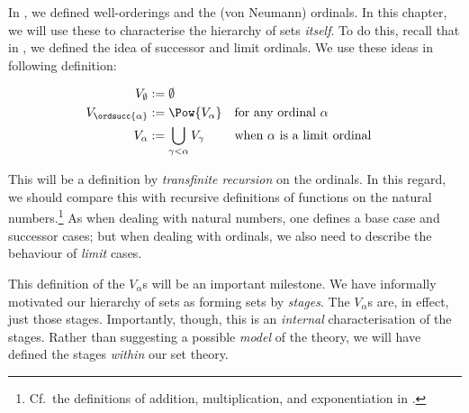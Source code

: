 \documentclass[../../../include/open-logic-section]{subfiles}
\begin{document}


In , we defined well-orderings and the
(von Neumann) ordinals. In this chapter, we will use these to
characterise the hierarchy of sets \emph{itself}. To do this, recall
that in , we defined the idea of
successor and limit ordinals. We use these ideas in following
definition:

\begin{defn}
	\begin{align*}
	V_\emptyset &:= \emptyset\\
	V_{\ordsucc{\alpha}} &:= \Pow{V_\alpha} & & 
	\text{for any ordinal }\alpha\\
	V_{\alpha} &:= \bigcup_{\gamma < \alpha} V_\gamma & & 
	\text{when }\alpha\text{ is a limit ordinal}
\end{align*}
\end{defn}
\noindent
This will be a definition by \emph{transfinite recursion} on the
ordinals. In this regard, we should compare this with recursive
definitions of functions on the natural numbers.\footnote{Cf.\ the
definitions of addition, multiplication, and exponentiation in
.} As when dealing with natural
numbers, one defines a base case and successor cases; but when dealing
with ordinals, we also need to describe the behaviour of \emph{limit}
cases. 

This definition of the $V_\alpha$s will be an important milestone. We
have informally motivated our hierarchy of sets as forming sets by
\emph{stages}. The $V_\alpha$s are, in effect, just those stages.
Importantly, though, this is an \emph{internal} characterisation of
the stages. Rather than suggesting a possible \emph{model} of the
theory, we will have defined the stages \emph{within} our set theory.
\end{document}
